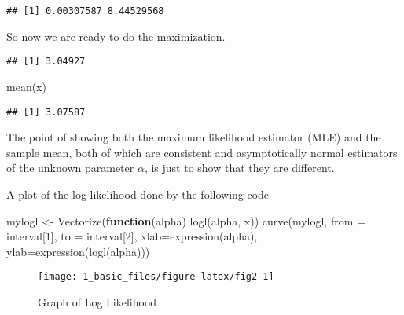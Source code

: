 \documentclass[
]{article}
\newenvironment{Shaded}{\begin{snugshade}}{\end{snugshade}}
\newcommand{\AttributeTok}[1]{\textcolor[rgb]{0.77,0.63,0.00}{#1}}
\newcommand{\ConstantTok}[1]{\textcolor[rgb]{0.00,0.00,0.00}{#1}}
\newcommand{\ControlFlowTok}[1]{\textcolor[rgb]{0.13,0.29,0.53}{\textbf{#1}}}
\newcommand{\DecValTok}[1]{\textcolor[rgb]{0.00,0.00,0.81}{#1}}
\newcommand{\FunctionTok}[1]{\textcolor[rgb]{0.00,0.00,0.00}{#1}}
\newcommand{\NormalTok}[1]{#1}
\newcommand{\OtherTok}[1]{\textcolor[rgb]{0.56,0.35,0.01}{#1}}
\newcommand{\SpecialCharTok}[1]{\textcolor[rgb]{0.00,0.00,0.00}{#1}}
\begin{document}
\begin{verbatim}
## [1] 0.00307587 8.44529568
\end{verbatim}

So now we are ready to do the maximization.

\begin{Shaded}
\end{Shaded}

\begin{verbatim}
## [1] 3.04927
\end{verbatim}

\begin{Shaded}
\begin{Highlighting}[]
\FunctionTok{mean}\NormalTok{(x)}
\end{Highlighting}
\end{Shaded}

\begin{verbatim}
## [1] 3.07587
\end{verbatim}

The point of showing both the maximum likelihood estimator (MLE) and the
sample mean, both of which are consistent and asymptotically normal
estimators of the unknown parameter \(\alpha\), is just to show that
they are different.

A plot of the log likelihood done by the following code

\begin{Shaded}
\begin{Highlighting}[]
\NormalTok{mylogl }\OtherTok{\textless{}{-}} \FunctionTok{Vectorize}\NormalTok{(}\ControlFlowTok{function}\NormalTok{(alpha) }\FunctionTok{logl}\NormalTok{(alpha, x))}
\FunctionTok{curve}\NormalTok{(mylogl, }\AttributeTok{from =}\NormalTok{ interval[}\DecValTok{1}\NormalTok{], }\AttributeTok{to =}\NormalTok{ interval[}\DecValTok{2}\NormalTok{],}
    \AttributeTok{xlab=}\FunctionTok{expression}\NormalTok{(alpha), }\AttributeTok{ylab=}\FunctionTok{expression}\NormalTok{(}\FunctionTok{logl}\NormalTok{(alpha)))}
\end{Highlighting}
\end{Shaded}

\begin{figure}

{\centering \texttt{[image: 1\_basic\_files/figure-latex/fig2-1]} 

}

\caption{Graph of Log Likelihood}\label{fig:fig2}
\end{figure}
\end{document}
